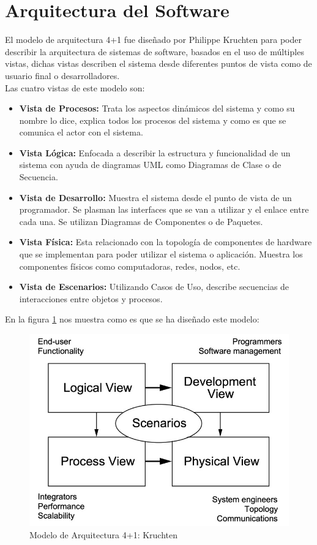 \section{Arquitectura del Software}
El modelo de arquitectura 4+1 fue diseñado por Philippe Kruchten para poder describir la arquitectura de sistemas de software, basados en el uso de múltiples vistas, dichas vistas describen el sistema desde diferentes puntos de vista como de usuario final o desarrolladores. \\
Las cuatro vistas de este modelo son:
\begin{itemize}
	\item \textbf{Vista de Procesos:} Trata los aspectos dinámicos del sistema y como su nombre lo dice, explica todos los procesos del sistema y como es que se comunica el actor con el sistema.
	\item \textbf{Vista Lógica:} Enfocada a describir la estructura y funcionalidad de un sistema con ayuda de diagramas UML como Diagramas de Clase o de Secuencia.

	\item \textbf{Vista de Desarrollo:} Muestra el sistema desde el punto de vista de un programador. Se plasman las interfaces que se van a utilizar y el enlace entre cada una. Se utilizan Diagramas de Componentes o de Paquetes.
	\item \textbf{Vista Física:} Esta relacionado con la topología de componentes de hardware que se implementan para poder utilizar el sistema o aplicación. Muestra los componentes físicos como computadoras, redes, nodos, etc.
	\item \textbf{Vista de Escenarios:} Utilizando Casos de Uso, describe secuencias de interacciones entre objetos y procesos.
\end{itemize}

En la figura \ref{fig:Modelo de Arquitectura 4+1: Kruchten} nos muestra como es que se ha diseñado este modelo:
\begin{figure}[!h]
	\centering
	\includegraphics[width=1\textwidth]{./diseno/arquitectura/imagenes/arquitectura}
	\caption{Modelo de Arquitectura 4+1: Kruchten}
	\label{fig:Modelo de Arquitectura 4+1: Kruchten}
\end{figure}
